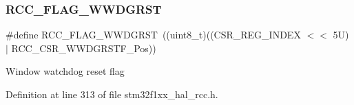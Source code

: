 \subsubsection{\texorpdfstring{R\+C\+C\+\_\+\+F\+L\+A\+G\+\_\+\+W\+W\+D\+G\+R\+ST}{RCC\_FLAG\_WWDGRST}}
{\footnotesize\ttfamily \#define R\+C\+C\+\_\+\+F\+L\+A\+G\+\_\+\+W\+W\+D\+G\+R\+ST~((uint8\+\_\+t)((C\+S\+R\+\_\+\+R\+E\+G\+\_\+\+I\+N\+D\+EX $<$$<$ 5\+U) $\vert$ R\+C\+C\+\_\+\+C\+S\+R\+\_\+\+W\+W\+D\+G\+R\+S\+T\+F\+\_\+\+Pos))}

Window watchdog reset flag 

Definition at line 313 of file stm32f1xx\+\_\+hal\+\_\+rcc.\+h.


